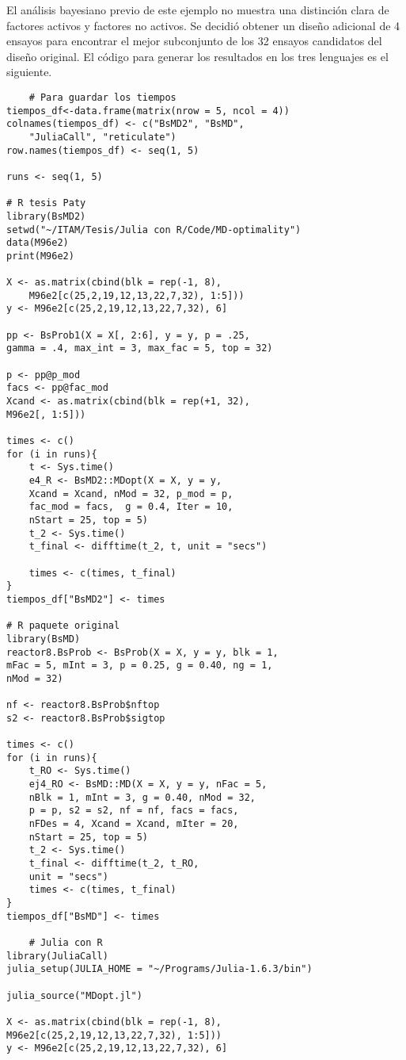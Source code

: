 El análisis bayesiano previo de este ejemplo no muestra una distinción clara de factores activos y factores no activos. Se decidió obtener un diseño adicional de 4 ensayos para encontrar el mejor subconjunto de los 32 ensayos candidatos del diseño original. El código para generar los resultados en los tres lenguajes es el siguiente.

\begin{verbatim}
	# Para guardar los tiempos
tiempos_df<-data.frame(matrix(nrow = 5, ncol = 4))
colnames(tiempos_df) <- c("BsMD2", "BsMD", 
	"JuliaCall", "reticulate")
row.names(tiempos_df) <- seq(1, 5)
	
runs <- seq(1, 5)

# R tesis Paty
library(BsMD2)
setwd("~/ITAM/Tesis/Julia con R/Code/MD-optimality")
data(M96e2)
print(M96e2)
	
X <- as.matrix(cbind(blk = rep(-1, 8), 
	M96e2[c(25,2,19,12,13,22,7,32), 1:5]))
y <- M96e2[c(25,2,19,12,13,22,7,32), 6]
	
pp <- BsProb1(X = X[, 2:6], y = y, p = .25, 
gamma = .4, max_int = 3, max_fac = 5, top = 32)
	
p <- pp@p_mod
facs <- pp@fac_mod
Xcand <- as.matrix(cbind(blk = rep(+1, 32), 
M96e2[, 1:5]))
	
times <- c()
for (i in runs){
	t <- Sys.time()
	e4_R <- BsMD2::MDopt(X = X, y = y,
	Xcand = Xcand, nMod = 32, p_mod = p, 
	fac_mod = facs,  g = 0.4, Iter = 10, 
	nStart = 25, top = 5)
	t_2 <- Sys.time()
	t_final <- difftime(t_2, t, unit = "secs")
		
	times <- c(times, t_final)
}
tiempos_df["BsMD2"] <- times
	
# R paquete original 
library(BsMD)
reactor8.BsProb <- BsProb(X = X, y = y, blk = 1, 
mFac = 5, mInt = 3, p = 0.25, g = 0.40, ng = 1, 
nMod = 32)
	
nf <- reactor8.BsProb$nftop
s2 <- reactor8.BsProb$sigtop
	
times <- c()
for (i in runs){
	t_RO <- Sys.time()
	ej4_RO <- BsMD::MD(X = X, y = y, nFac = 5, 
	nBlk = 1, mInt = 3, g = 0.40, nMod = 32, 
	p = p, s2 = s2, nf = nf, facs = facs, 
	nFDes = 4, Xcand = Xcand, mIter = 20, 
	nStart = 25, top = 5)
	t_2 <- Sys.time() 
	t_final <- difftime(t_2, t_RO, 
	unit = "secs")
	times <- c(times, t_final)
}
tiempos_df["BsMD"] <- times

	# Julia con R
library(JuliaCall)
julia_setup(JULIA_HOME = "~/Programs/Julia-1.6.3/bin")
	
julia_source("MDopt.jl")
	
X <- as.matrix(cbind(blk = rep(-1, 8), 
M96e2[c(25,2,19,12,13,22,7,32), 1:5]))
y <- M96e2[c(25,2,19,12,13,22,7,32), 6]
	

\end{verbatim}
